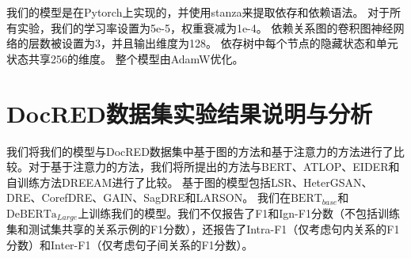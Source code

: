 \documentclass[bachelor]{thesis-uestc}
\begin{document}
我们的模型是在Pytorch上实现的，并使用stanza来提取依存和依赖语法。
对于所有实验，我们的学习率设置为5e-5，权重衰减为1e-4。
依赖关系图的卷积图神经网络的层数被设置为3，并且输出维度为128。
依存树中每个节点的隐藏状态和单元状态共享256的维度。
整个模型由AdamW优化。

\section{DocRED数据集实验结果说明与分析}\label{sec:docred}

我们将我们的模型与DocRED数据集中基于图的方法和基于注意力的方法进行了比较。对于基于注意力的方法，我们将所提出的方法与BERT、ATLOP、EIDER和自训练方法DREEAM进行了比较。
基于图的模型包括LSR、HeterGSAN、DRE、CorefDRE、GAIN、SagDRE和LARSON。
我们在$\mathrm{BERT}_{base}$和$\mathrm{DeBERTa}_{Large}$上训练我们的模型。我们不仅报告了F1和Ign-F1分数（不包括训练集和测试集共享的关系示例的F1分数），还报告了Intra-F1（仅考虑句内关系的F1分数）和Inter-F1（仅考虑句子间关系的F1分数）。\par
\end{document}
